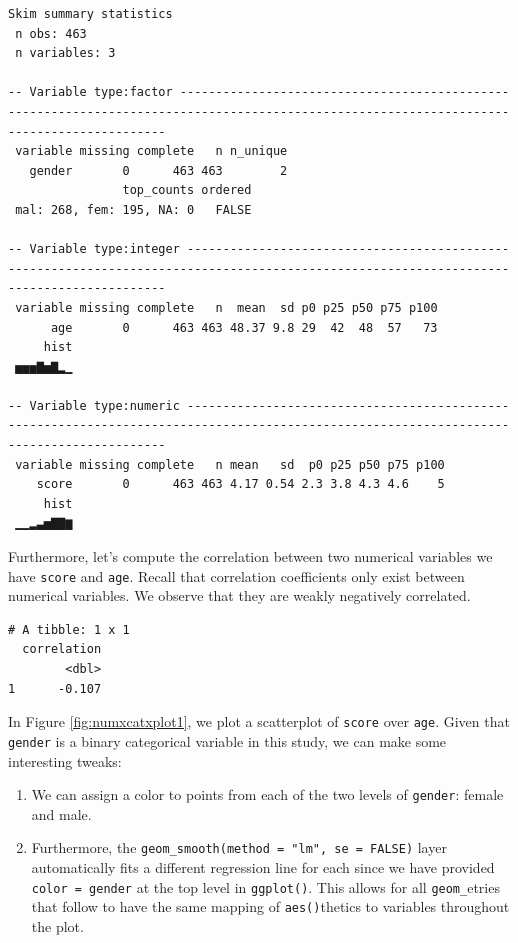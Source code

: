 \documentclass[12pt,]{krantz}
\makeatletter
\newenvironment{Shaded}{\begin{snugshade}}{\end{snugshade}}
\newcommand{\KeywordTok}[1]{\textcolor[rgb]{0.27,0.27,0.27}{\textbf{#1}}}
\newcommand{\DataTypeTok}[1]{\textcolor[rgb]{0.27,0.27,0.27}{#1}}
\newcommand{\StringTok}[1]{\textcolor[rgb]{0.5,0.5,0.5}{#1}}
\newcommand{\OperatorTok}[1]{\textcolor[rgb]{0.43,0.43,0.43}{\textbf{#1}}}
\newcommand{\NormalTok}[1]{#1}
\providecommand{\tightlist}{%
  \setlength{\itemsep}{0pt}\setlength{\parskip}{0pt}}
\newenvironment{kframe}{%
\medskip{}
\setlength{\fboxsep}{.8em}
 \def\at@end@of@kframe{}%
 \ifinner\ifhmode%
  \def\at@end@of@kframe{\end{minipage}}%
  \begin{minipage}{\columnwidth}%
 \fi\fi%
 \def\FrameCommand##1{\hskip\@totalleftmargin \hskip-\fboxsep
 \colorbox{shadecolor}{##1}\hskip-\fboxsep
     \hskip-\linewidth \hskip-\@totalleftmargin \hskip\columnwidth}%
 \MakeFramed {\advance\hsize-\width
   \@totalleftmargin\z@ \linewidth\hsize
   \@setminipage}}%
 {\par\unskip\endMakeFramed%
 \at@end@of@kframe}
\renewenvironment{Shaded}{\begin{kframe}}{\end{kframe}}
\theoremstyle{definition}
\theoremstyle{definition}
\theoremstyle{definition}
\theoremstyle{remark}
\makeatother
\begin{document}
\begin{verbatim}
Skim summary statistics
 n obs: 463 
 n variables: 3 

-- Variable type:factor ------------------------------------------------------------------------------------------------------------------------------------------
 variable missing complete   n n_unique
   gender       0      463 463        2
                top_counts ordered
 mal: 268, fem: 195, NA: 0   FALSE

-- Variable type:integer -----------------------------------------------------------------------------------------------------------------------------------------
 variable missing complete   n  mean  sd p0 p25 p50 p75 p100
      age       0      463 463 48.37 9.8 29  42  48  57   73
     hist
 ▅▅▅▇▅▇▂▁

-- Variable type:numeric -----------------------------------------------------------------------------------------------------------------------------------------
 variable missing complete   n mean   sd  p0 p25 p50 p75 p100
    score       0      463 463 4.17 0.54 2.3 3.8 4.3 4.6    5
     hist
 ▁▁▂▃▅▇▇▆
\end{verbatim}

Furthermore, let's compute the correlation between two numerical
variables we have \texttt{score} and \texttt{age}. Recall that
correlation coefficients only exist between numerical variables. We
observe that they are weakly negatively correlated.

\begin{Shaded}
\end{Shaded}

\begin{verbatim}
# A tibble: 1 x 1
  correlation
        <dbl>
1      -0.107
\end{verbatim}

In Figure \ref{fig:numxcatxplot1}, we plot a scatterplot of
\texttt{score} over \texttt{age}. Given that \texttt{gender} is a binary
categorical variable in this study, we can make some interesting tweaks:

\begin{enumerate}
\def\labelenumi{\arabic{enumi}.}
\tightlist
\item
  We can assign a color to points from each of the two levels of
  \texttt{gender}: female and male.
\item
  Furthermore, the \texttt{geom\_smooth(method\ =\ "lm",\ se\ =\ FALSE)}
  layer automatically fits a different regression line for each since we
  have provided \texttt{color\ =\ gender} at the top level in
  \texttt{ggplot()}. This allows for all \texttt{geom\_}etries that
  follow to have the same mapping of \texttt{aes()}thetics to variables
  throughout the plot.
\end{enumerate}
\end{document}
